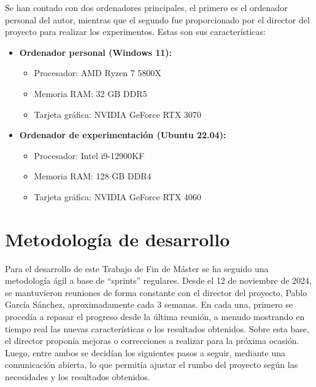 Se han contado con dos ordenadores principales, el primero es el ordenador personal del autor, mientras que el segundo fue proporcionado por el director del proyecto para realizar los experimentos. Estas son sus características:

\begin{itemize}
	\item \textbf{Ordenador personal (Windows 11):}
	      \begin{itemize}
		      \item Procesador: AMD Ryzen 7 5800X
		      \item Memoria RAM: 32 GB DDR5
		      \item Tarjeta gráfica: NVIDIA GeForce RTX 3070
	      \end{itemize}
	\item \textbf{Ordenador de experimentación (Ubuntu 22.04):}
	      \begin{itemize}
		      \item Procesador: Intel i9-12900KF
		      \item Memoria RAM: 128 GB DDR4
		      \item Tarjeta gráfica: NVIDIA GeForce RTX 4060
	      \end{itemize}
\end{itemize}

\section{Metodología de desarrollo} \label{sec:metodologia_desarrollo}


Para el desarrollo de este Trabajo de Fin de Máster se ha seguido una metodología ágil a base de ``sprints'' regulares. Desde el 12 de noviembre de 2024, se mantuvieron reuniones de forma constante con el director del proyecto, Pablo García Sánchez, aproximadamente cada 3 semanas. En cada una, primero se procedía a repasar el progreso desde la última reunión, a menudo mostrando en tiempo real las nuevas características o los resultados obtenidos. Sobre esta base, el director proponía mejoras o correcciones a realizar para la próxima ocasión. Luego, entre ambos se decidían los siguientes pasos a seguir, mediante una comunicación abierta, lo que permitía ajustar el rumbo del proyecto según las necesidades y los resultados obtenidos.

